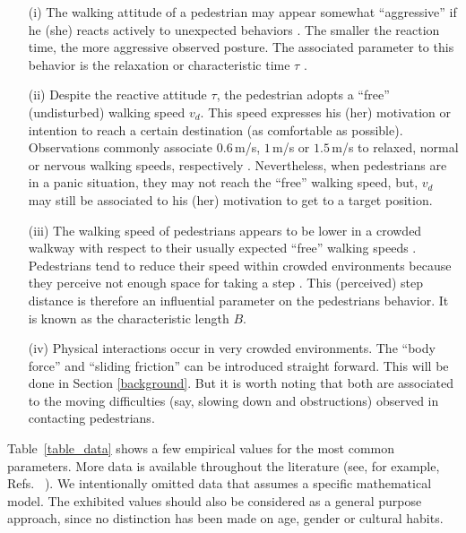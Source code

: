 \documentclass[preprint,12pt]{elsarticle}
\begin{document}
\begin{itemize}
\item[(i)] The walking attitude of a pedestrian may appear somewhat 
  ``aggressive'' if he (she) reacts actively to unexpected behaviors 
\cite{lakoba_2005,helbing_1995}. The smaller the reaction time, the more 
 aggressive observed posture. The associated parameter to this 
behavior is the relaxation or characteristic time $\tau$ 
\cite{johansson_2009,helbing_2000}. 

\item[(ii)] Despite the reactive attitude $\tau$, the pedestrian adopts a 
``free'' (undisturbed) walking speed $v_d$. This speed expresses his (her) 
motivation or intention to reach a certain destination (as comfortable as 
possible). Observations commonly associate $0.6\,$m/s, $1\,$m/s or $1.5\,$m/s 
to relaxed, normal or nervous walking speeds, respectively  
\cite{helbing_1995,helbing_2000,li_2015}. 
Nevertheless, when pedestrians are in a panic situation,
 they may not reach the ``free'' walking speed, but, $v_d$ may still be 
 associated to his (her) motivation to get to a target position.

\item[(iii)] The walking speed of pedestrians appears to be lower in a 
crowded walkway with respect to their usually expected ``free'' walking speeds 
\cite{weidmann_1992,lakoba_2005}. Pedestrians tend to reduce their speed within 
crowded environments because they perceive not enough space for taking a 
step  \cite{johansson_2009}. This (perceived) step distance 
is therefore an influential parameter on the pedestrians behavior. 
It is known as the characteristic length $B$.

\item[(iv)] Physical interactions occur in very crowded environments. The 
``body force''  and ``sliding friction'' can be introduced straight forward. 
This will be done in Section \ref{background}. But it is worth noting that 
both are associated to the moving difficulties (say, slowing down and 
obstructions) observed in contacting pedestrians. 

\end{itemize}


Table~\ref{table_data} shows a few empirical values
 for the most common 
parameters. More data is available throughout the literature (see, for example, 
Refs.~\cite{hoogendoorn_2007,seyfried_2007,johansson_2007,moussaid_2009,
luber_2010,seer_2014,li_2015} ). We intentionally omitted data that assumes a 
specific mathematical model. The exhibited values should also be considered as a 
general purpose approach, since no distinction has been made on age, gender or 
cultural habits. \\
\end{document}
